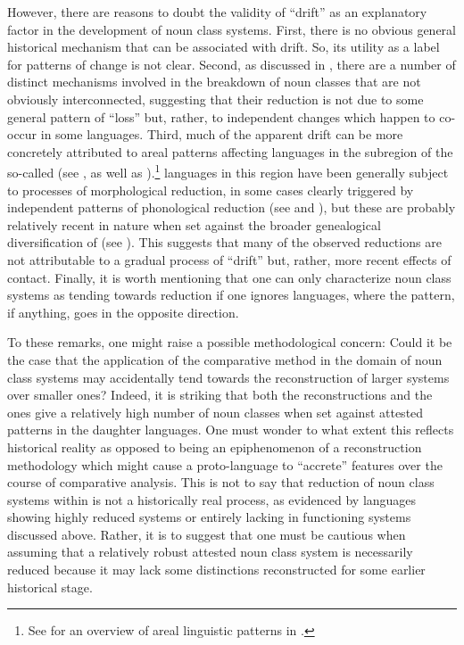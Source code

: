 \documentclass[output=paper ,collection	  ,collectionchapter ,biblatexbackend=biber   ]{langscibook}
\begin{document}
However, there are reasons to doubt the validity of ``drift'' as an explanatory
factor in the development of  noun class systems. First, there is no
obvious general historical mechanism that can be associated with drift. So, its
utility as a label for patterns of change is not clear. Second, as discussed in
, there are a number of distinct mechanisms
involved in the breakdown of noun classes that are not obviously interconnected,
suggesting that their reduction is not due to some general pattern of ``loss''
but, rather, to independent changes which happen to co-occur in some 
languages. Third, much of the apparent drift can be more concretely attributed
to areal patterns affecting  languages in the 
subregion of the so-called  (see
, as well as
).{\footnote{See  for
an overview of areal linguistic patterns in .}}  languages
in this region have been generally subject to processes of morphological
reduction, in some cases clearly triggered by independent patterns of
phonological reduction (see  and ),
but these are probably relatively recent in nature when set against the broader
genealogical diversification of  (see ). This
suggests that many of the observed reductions are not attributable to a gradual
process of ``drift'' but, rather, more recent effects of contact. Finally, it
is worth mentioning that one can only characterize  noun class systems as
tending towards reduction if one ignores  languages, where the pattern, if
anything, goes in the opposite direction.

\largerpage[-1]
To these remarks, one might raise a possible methodological concern: Could it be
the case that the application of the comparative method in the domain of noun
class systems may accidentally tend towards the reconstruction of larger systems
over smaller ones? Indeed, it is striking that both the 
reconstructions and the  ones give a relatively high number of noun
classes when set against attested patterns in the daughter languages. One must
wonder to what extent this reflects historical reality as opposed to being an
epiphenomenon of a reconstruction methodology which might cause a proto-language
to ``accrete'' features over the course of comparative analysis. This is not to
say that reduction of noun class systems within  is not a
historically real process, as evidenced by languages showing highly reduced
systems or entirely lacking in functioning systems discussed above. Rather, it
is to suggest that one must be cautious when assuming that a relatively robust
attested noun class system is necessarily reduced because it may lack some
distinctions reconstructed for some earlier historical stage.
\end{document}

